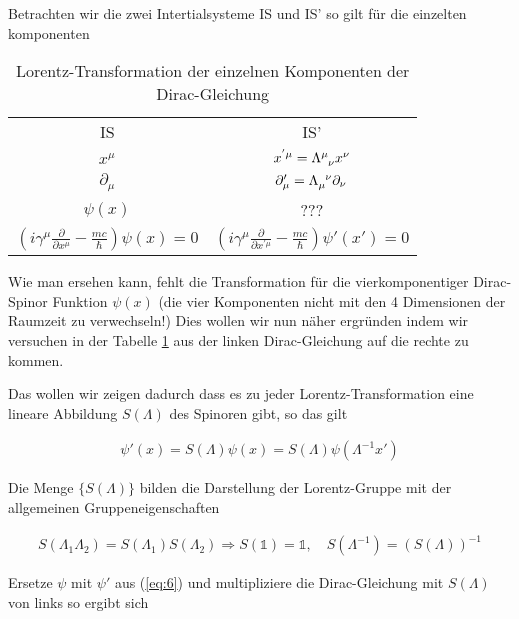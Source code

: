 Betrachten wir die zwei Intertialsysteme IS und IS' so gilt für die einzelten komponenten

\begin{table}[h]
  \centering

\begin{tabular}{c|c}
  IS&IS'\\
\(x^\mu\)& \(x^{'\mu}=\Lambda^\mu_{\hphantom\mu \nu} x^\nu\)\\
\(\partial_\mu \)&\(\partial'_\mu = \Lambda_{\mu}^{\hphantom\mu\nu}\partial_\nu \)\\
\(\psi(x)\)& ???\\
\((i\gamma^\mu\frac{\partial}{\partial x^\mu}-\frac{mc}{\hbar})\psi(x) = 0\)&\((i\gamma^\mu\frac{\partial}{\partial x^{'\mu}}-\frac{mc}{\hbar})\psi'(x') = 0\)
\end{tabular}

  \caption{Lorentz-Transformation der einzelnen Komponenten der Dirac-Gleichung}
  \label{tab:1}
\end{table}

Wie man ersehen kann, fehlt die Transformation für die vierkomponentiger Dirac-Spinor Funktion \(\psi(x)\) (die vier Komponenten nicht mit den 4 Dimensionen der Raumzeit zu verwechseln!)  Dies wollen wir nun näher ergründen indem wir versuchen in der Tabelle \ref{tab:1} aus der linken Dirac-Gleichung auf die rechte zu kommen.

Das wollen wir zeigen dadurch dass es zu jeder Lorentz-Transformation eine lineare Abbildung \(S(\Lambda)\) des Spinoren gibt, so das gilt

\begin{align}
  \label{eq:6}
  \psi'(x) = S(\Lambda)\psi(x) = S(\Lambda)\psi(\Lambda^{-1} x')
\end{align}

Die Menge \(\{S(\Lambda)\}\) bilden die Darstellung der Lorentz-Gruppe mit der allgemeinen Gruppeneigenschaften

\begin{align}
  \label{eq:7}
  \boxed{S(\Lambda_1\Lambda_2) = S(\Lambda_1)S(\Lambda_2) \Rightarrow S(\mathbb 1) = \mathbb 1, \quad S(\Lambda^{-1})=(S(\Lambda))^{-1}}
\end{align}

Ersetze \(\psi\) mit \(\psi'\) aus (\ref{eq:6}) und multipliziere die Dirac-Gleichung mit \(S(\Lambda)\) von links so ergibt sich

